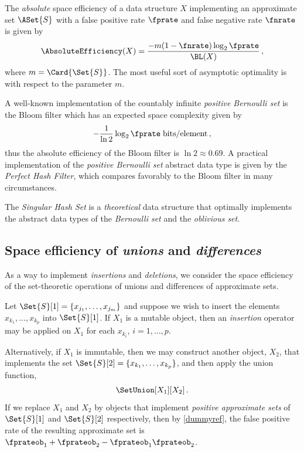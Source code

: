 \documentclass[ ../main.tex]{subfiles}
\begin{document}
The \emph{absolute} space efficiency of a data structure $X$ implementing an 
approximate set $\ASet{S}$ with a false positive rate $\fprate$ and false 
negative rate $\fnrate$ is given by
\begin{equation}
    \AbsoluteEfficiency(X) = \frac{-m(1 - \fnrate)\log_2 \fprate}{\BL(X)}\,,
\end{equation}
where $m = \Card{\Set{S}}$. The most useful sort of asymptotic optimality is 
with respect to the parameter $m$.

A well-known implementation of the countably infinite \emph{positive Bernoulli
set} is the Bloom filter\cite{bf} which has an expected space complexity given
by
\begin{equation}
    -\frac{1}{\ln 2} \log_2 \fprate \; \si{bits \per element}\,,
\end{equation}
thus the absolute efficiency of the Bloom filter is $\ln 2 \approx 0.69$. 
A practical implementation of the \emph{positive Bernoulli set} abstract data
type is given by the \emph{Perfect Hash Filter}\cite{phf}, which compares
favorably to the Bloom filter in many circumstances.

The \emph{Singular Hash Set}\cite{shs} is a \emph{theoretical} data structure
that optimally implements the abstract data types of the \emph{Bernoulli set}
and the \emph{oblivious set}\cite{obset}.

\subsection{Space efficiency of \emph{unions} and \emph{differences}}
As a way to implement \emph{insertions} and \emph{deletions}, we consider the 
space efficiency of the set-theoretic operations of unions and differences of 
approximate sets.

Let $\Set{S}[1] = \{x_{j_1}, \ldots, x_{j_m}\}$ and suppose we wish to insert 
the elements $x_{k_1},\ldots,x_{k_p}$ into $\Set{S}[1]$. If $X_1$ is a mutable 
object, then an \emph{insertion} operator may be applied on $X_1$ for each 
$x_{k_i}$, $i=1,\ldots, p$.

Alternatively, if $X_1$ is immutable, then we may construct another object, 
$X_2$, that implements the set $\Set{S}[2] = \{x_{k_1},\ldots, x_{k_p}\}$, and 
then apply the union function,
\begin{equation}
    \SetUnion[X_1][X_2]\,.
\end{equation}
If we replace $X_1$ and $X_2$ by objects that implement \emph{positive 
approximate sets} of $\Set{S}[1]$ and $\Set{S}[2]$ respectively, then by 
\cref{dummyref}, the false positive rate of the resulting approximate set is 
$\fprateob_1 + \fprateob_2 - \fprateob_1 \fprateob_2$.
\end{document}
